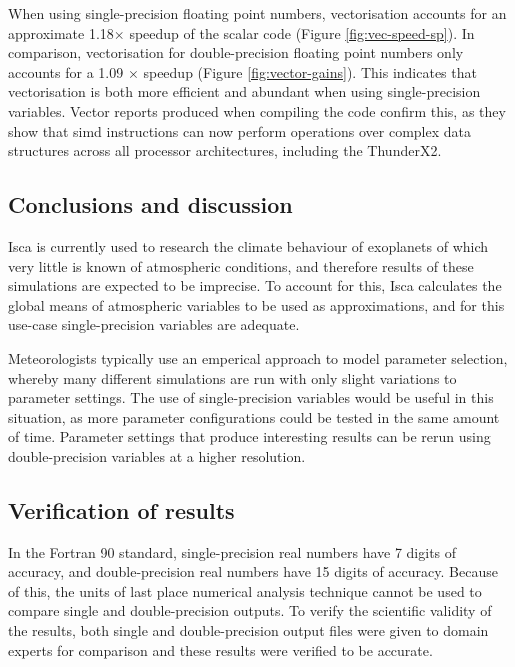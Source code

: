 \documentclass[a4paper,11pt]{report}
\begin{document}
\par
When using single-precision floating point numbers, vectorisation accounts for an approximate 1.18$\times$ speedup of the scalar code (Figure \ref{fig:vec-speed-sp}). In comparison, vectorisation for double-precision floating point numbers only accounts for a 1.09 $\times$ speedup (Figure \ref{fig:vector-gains}). This indicates that vectorisation is both more efficient and abundant when using single-precision variables. Vector reports produced when compiling the code confirm this, as they show that \gls{simd} instructions can now perform operations over complex data structures across all processor architectures, including the ThunderX2. 
\par

\subsection{Conclusions and discussion}
\par
Isca is currently used to research the climate behaviour of exoplanets of which very little is known of atmospheric conditions, and therefore results of these simulations are expected to be imprecise. To account for this, Isca calculates the global means of atmospheric variables to be used as approximations, and for this use-case single-precision variables are adequate.
\par
Meteorologists typically use an emperical approach to model parameter selection, whereby many different simulations are run with only slight variations to parameter settings. The use of single-precision variables would be useful in this situation, as more parameter configurations could be tested in the same amount of time. Parameter settings that produce interesting results can be rerun using double-precision variables at a higher resolution. 

\subsection{Verification of results}
In the Fortran 90 standard, single-precision real numbers have 7 digits of accuracy, and double-precision real numbers have 15 digits of accuracy. Because of this, the units of last place numerical analysis technique cannot be used to compare single and double-precision outputs. To verify the scientific validity of the results, both single and double-precision output files were given to domain experts for comparison and these results were verified to be accurate.
\end{document}
